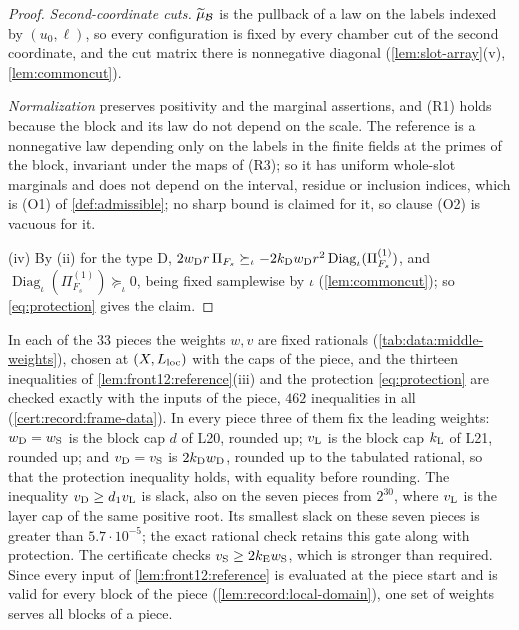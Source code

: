 \begin{proof}
\emph{Second-coordinate cuts.} $\widetilde\mu_{\mathcal B}$ is the pullback of a law on
the labels indexed by $(u_0,\ell)$, so every configuration is fixed by every
chamber cut of the second coordinate, and the cut matrix there is
nonnegative diagonal (\cref{lem:slot-array}(v), \cref{lem:commoncut}).

\emph{Normalization} preserves positivity and the marginal assertions, and
(R1) holds because the block and its law do not depend on the scale. The
reference is a nonnegative law depending only on the labels in the finite fields at the primes of the block, invariant under
the maps of (R3); so it has uniform whole-slot marginals and does not depend
on the interval, residue or inclusion indices, which is (O1) of
\cref{def:admissible}; no sharp bound is claimed for it, so clause (O2) is vacuous for it.

(iv) By (ii) for the type D,
$2w_{\rm D}r\,\Pi_{F_s}\succeq_\iota-2k_{\rm D}w_{\rm D}r^2
\operatorname{Diag}_\iota(\Pi^{(1)}_{F_s})$, and
$\operatorname{Diag}_\iota(\Pi^{(1)}_{F_s})\succeq_\iota0$, being fixed
samplewise by $\iota$ (\cref{lem:commoncut}); so \eqref{eq:protection} gives
the claim.
\end{proof}

\begin{remark}\label{rem:middle-weights}
In each of the $33$ pieces the weights $w,v$ are fixed rationals
(\cref{tab:data:middle-weights}), chosen at $(X,L_{\rm loc})$ with the caps of
the piece, and the thirteen inequalities of \cref{lem:front12:reference}(iii)
and the protection \eqref{eq:protection} are checked exactly with the inputs
of the piece, $462$ inequalities in all (\cref{cert:record:frame-data}). In
every piece three of them fix the leading weights: $w_{\rm D}=w_{\rm S}$ is the
block cap $d$ of L20, rounded up; $v_{\rm L}$ is the block cap $k_{\rm L}$ of
L21, rounded up; and $v_{\rm D}=v_{\rm S}$ is $2k_{\rm D}w_{\rm D}$,
rounded up to the tabulated rational, so that the protection inequality holds, with equality before rounding. The inequality
$v_{\rm D}\ge d_1v_{\rm L}$ is slack, also on the seven pieces from $2^{30}$,
where $v_{\rm L}$ is the layer cap of the same positive root. Its
smallest slack on these seven pieces is greater than $5.7\cdot10^{-5}$;
the exact rational check retains this gate along with protection. The certificate checks $v_{\rm S}\ge2k_{\rm E}w_{\rm S}$, which is
stronger than required. Since every input of \cref{lem:front12:reference} is
evaluated at the piece start and is valid for every block of the piece
(\cref{lem:record:local-domain}), one set of weights serves all blocks of a
piece.
\end{remark}

